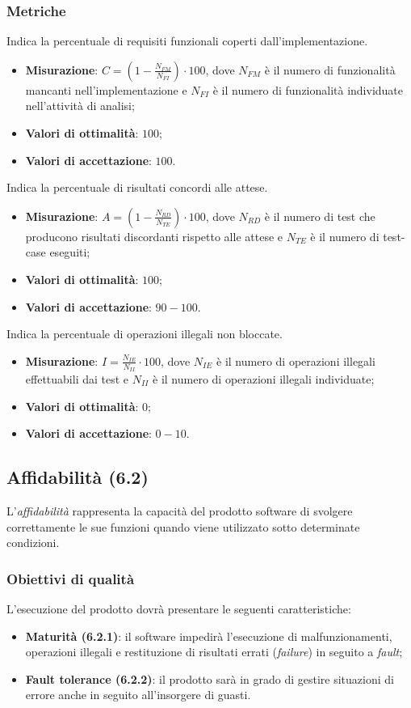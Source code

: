 \subsubsection{Metriche}
\label{complImplFunz}
Indica la percentuale di requisiti funzionali coperti dall'implementazione.
\begin{itemize}
\item \textbf{Misurazione}: $C=(1-\frac{N_{FM}}{N_{FI}}) \cdot 100$, dove $N_{FM}$ è il numero di funzionalità mancanti nell'implementazione e $N_{FI}$ è il numero di funzionalità individuate nell'attività di analisi;
\item \textbf{Valori di ottimalità}: $100$;
\item \textbf{Valori di accettazione}: $100$.
\end{itemize}
\label{accRispettoAttese}
Indica la percentuale di risultati concordi alle attese.
\begin{itemize}
\item \textbf{Misurazione}: $A=(1-\frac{N_{RD}}{N_{TE}}) \cdot 100$, dove $N_{RD}$ è il numero di test che producono risultati discordanti rispetto alle attese e $N_{TE}$ è il numero di test-case eseguiti;
\item \textbf{Valori di ottimalità}: $100$;
\item \textbf{Valori di accettazione}: $90 - 100$.
\end{itemize}
\label{controlloAccessi}
Indica la percentuale di operazioni illegali non bloccate.
\begin{itemize}
\item \textbf{Misurazione}: $I=\frac{N_{IE}}{N_{II}} \cdot 100$, dove $N_{IE}$ è il numero di operazioni illegali effettuabili dai test e $N_{II}$ è il numero di operazioni illegali individuate;
\item \textbf{Valori di ottimalità}: $0$;
\item \textbf{Valori di accettazione}: $0 - 10$.
\end{itemize}
\subsection{Affidabilità (6.2)}
\label{affidabilita}
L'\emph{affidabilità} rappresenta la capacità del prodotto software di svolgere correttamente le sue funzioni quando viene utilizzato sotto determinate condizioni.
\subsubsection{Obiettivi di qualità}
L'esecuzione del prodotto dovrà presentare le seguenti caratteristiche:
\begin{itemize}
\item \textbf{Maturità (6.2.1)}: il software impedirà l'esecuzione di malfunzionamenti, operazioni illegali e restituzione di risultati errati (\textit{failure}) in seguito a \textit{fault};
\item \textbf{Fault tolerance (6.2.2)}: il prodotto sarà in grado di gestire situazioni di errore anche in seguito all'insorgere di guasti.
\end{itemize}
